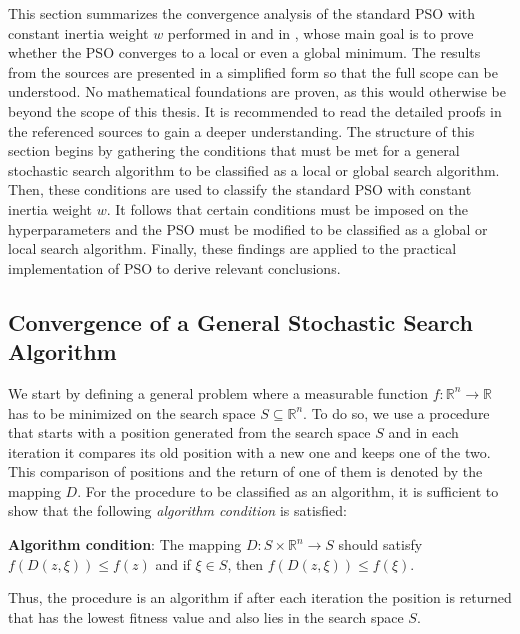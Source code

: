 \documentclass[
  oneside, a4paper, 12pt, openany]{book}
\theoremstyle{definition}
\theoremstyle{definition}
\theoremstyle{definition}
\theoremstyle{definition}
\theoremstyle{remark}
\begin{document}
This section summarizes the convergence analysis of the standard PSO with constant inertia weight \(w\) performed in \citep{FbEn2010} and in \citep{FbEn2007}, whose main goal is to prove whether the PSO converges to a local or even a global minimum. The results from the sources are presented in a simplified form so that the full scope can be understood. No mathematical foundations are proven, as this would otherwise be beyond the scope of this thesis. It is recommended to read the detailed proofs in the referenced sources to gain a deeper understanding. The structure of this section begins by gathering the conditions that must be met for a general stochastic search algorithm to be classified as a local or global search algorithm. Then, these conditions are used to classify the standard PSO with constant inertia weight \(w\). It follows that certain conditions must be imposed on the hyperparameters and the PSO must be modified to be classified as a global or local search algorithm. Finally, these findings are applied to the practical implementation of PSO to derive relevant conclusions.

\hypertarget{convergence-of-a-general-stochastic-search-algorithm}{%
\subsection{Convergence of a General Stochastic Search Algorithm}\label{convergence-of-a-general-stochastic-search-algorithm}}

We start by defining a general problem where a measurable function \(f: \mathbb{R}^n\rightarrow\mathbb{R}\) has to be minimized on the search space \(S \subseteq \mathbb{R}^n\). To do so, we use a procedure that starts with a position generated from the search space \(S\) and in each iteration it compares its old position with a new one and keeps one of the two. This comparison of positions and the return of one of them is denoted by the mapping \(D\). For the procedure to be classified as an algorithm, it is sufficient to show that the following \emph{algorithm condition} is satisfied:

\textbf{Algorithm condition}: The mapping \(D: S \times \mathbb{R}^n\rightarrow S\) should satisfy \(f(D(z, \xi)) \leq f(z)\) and if \(\xi \in S\), then \(f(D(z, \xi)) \leq f(\xi)\).

Thus, the procedure is an algorithm if after each iteration the position is returned that has the lowest fitness value and also lies in the search space \(S\).
\end{document}
